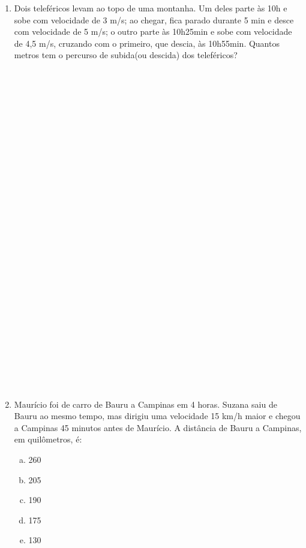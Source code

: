 \documentclass[a4paper,14pt]{article}
\begin{document}
\begin{multicols}{2}
\begin{enumerate}
            \item Dois teleféricos levam ao topo de uma montanha. Um deles parte às 10h e sobe com velocidade de 3 m/s; ao chegar, fica parado durante 5 min e desce com velocidade de 5 m/s; o outro parte às 10h25min e sobe com velocidade de 4,5 m/s, cruzando com o primeiro, que descia, às 10h55min. Quantos metros tem o percurso de subida(ou descida) dos teleféricos? \\\\\\\\\\\\\\\\\\\\\\\\\\\\\\\\\\\\\\\\\\\\\\\\\\\\\\\\\\
            \item Maurício foi de carro de Bauru a Campinas em 4 horas. Suzana saiu de Bauru ao mesmo tempo, mas dirigiu uma velocidade 15 km/h maior e chegou a Campinas 45 minutos antes de Maurício. A distância de Bauru a Campinas, em quilômetros, é:
            \begin{enumerate}[a)]
            	\item 260
            	\item 205
            	\item 190
            	\item 175
            	\item 130
            \end{enumerate}
    	\end{enumerate}

\end{multicols}
\end{document}
